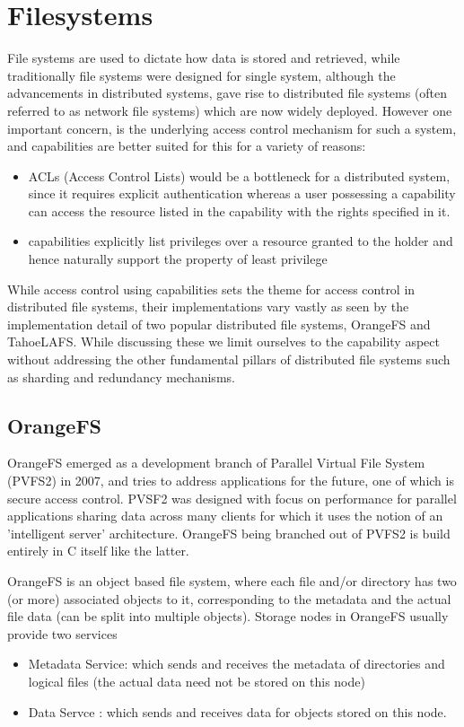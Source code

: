 \section{Filesystems}
\label{sec:filesystem}

File systems are used to dictate how data is stored and retrieved, while traditionally file systems were designed for single system, although the advancements in distributed systems, gave rise to distributed file systems (often referred to as network file systems) which are now widely deployed. However one important concern, is the underlying access control mechanism for such a system, and capabilities are better suited\cite{miltchev2008} for this for a variety of reasons:
\begin{itemize}
\item ACLs (Access Control Lists) would be a bottleneck for a distributed system, since it requires explicit authentication whereas a user possessing a capability can access the resource listed in the capability with the rights specified in it.
\item capabilities explicitly list privileges over a resource granted to the holder and hence naturally support the property of least privilege
\end{itemize} 
While access control using capabilities sets the theme for access control in distributed file systems, their implementations vary vastly as seen by the implementation detail of two popular distributed file systems, OrangeFS and TahoeLAFS. While discussing these we limit ourselves to the capability aspect without addressing the other fundamental pillars of distributed file systems such as sharding and redundancy mechanisms.

\subsection{ OrangeFS }
OrangeFS emerged as a development branch of Parallel Virtual File System (PVFS2) in 2007, and tries to address applications for the future, one of which is secure access control. PVSF2 was designed with focus on performance for parallel applications sharing data across many clients for which it uses the notion of an 'intelligent server' architecture. OrangeFS being branched out of PVFS2 is build entirely in C itself like the latter.

OrangeFS is an object based file system, where each file and/or directory has two (or more) associated objects to it, corresponding to the metadata and the actual file data (can be split into multiple objects). Storage nodes in OrangeFS usually provide two services
\begin{itemize}
\item Metadata Service: which sends and receives the metadata of directories and logical files (the actual data need not be stored on this node)
\item Data Servce : which sends and receives data for objects stored on this node.
\end{itemize}

